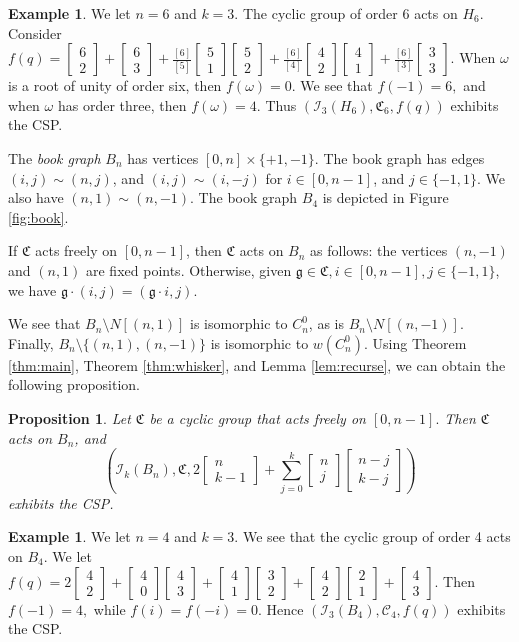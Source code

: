\documentclass[12pt]{article}
\newtheorem{proposition}[theorem]{Proposition}
\theoremstyle{definition}
\newtheorem{example}[theorem]{Example}
\newcommand{\gau}[2]{\left[ \begin{array}{c} #1 \\ #2 \end{array} \right]}
\begin{document}
\begin{example}
We let $n = 6$ and $k=3.$ The cyclic group of order $6$ acts on $H_6.$
Consider $f(q) = \gau{6}{2}+\gau{6}{3} + \frac{[6]}{[5]}\gau{5}{1}\gau{5}{2} + \frac{[6]}{[4]}\gau{4}{2}\gau{4}{1}+\frac{[6]}{[3]}\gau{3}{3}.$ When $\omega$ is a root of unity of order six, then $f(\omega) = 0$. We see that $f(-1) = 6,$ and when $\omega$ has order three, then $f(\omega) = 4$. Thus $(\mathcal{I}_3(H_6), \mathfrak{C}_6, f(q))$ exhibits the CSP.
\end{example}

The \emph{book graph} $B_n$ has vertices $[0,n] \times \{+1,-1\}.$ The book graph has edges $(i,j) \sim (n,j)$, and $(i,j) \sim (i,-j)$ for $i \in [0,n-1]$, and $j \in \{-1,1\}.$ We also have $(n,1) \sim (n,-1).$ The book graph $B_4$ is depicted in Figure \ref{fig:book}.

If $\mathfrak{C}$ acts freely on $[0,n-1]$, then $\mathfrak{C}$ acts on $B_n$ as follows: the vertices $(n,-1)$ and $(n,1)$ are fixed points. Otherwise, given $\mathfrak{g} \in \mathfrak{C}, i \in [0,n-1], j \in \{-1, 1\}$, we have $\mathfrak{g} \cdot (i,j) = (\mathfrak{g}\cdot i, j)$.

We see that $B_n \setminus N[(n,1)]$ is isomorphic to $C_n^0$, as is $B_n \setminus N[(n,-1)]$. Finally, $B_n \setminus \{(n,1), (n,-1)\}$ is isomorphic to $w(C^0_n).$ Using Theorem \ref{thm:main}, Theorem \ref{thm:whisker}, and Lemma \ref{lem:recurse}, we can obtain the following proposition.
\begin{proposition}
Let $\mathfrak{C}$ be a cyclic group that acts freely on $[0,n-1].$ Then $\mathfrak{C}$ acts on $B_n$, and \[\left(\mathcal{I}_k(B_n), \mathfrak{C}, 2\gau{n}{k-1}+\sum_{j=0}^k \gau{n}{j}\gau{n-j}{k-j} \right)\] exhibits the CSP.
\end{proposition}

\begin{example}
We let $n=4$ and $k=3.$
We see that the cyclic group of order 4 acts on $B_4$. We let $f(q) = 2\gau{4}{2}+\gau{4}{0}\gau{4}{3}+\gau{4}{1}\gau{3}{2}+\gau{4}{2}\gau{2}{1}+\gau{4}{3}$. Then $f(-1) = 4,$ while $f(i) = f(-i) = 0.$ Hence $(\mathcal{I}_3(B_4), \mathcal{C}_4, f(q))$ exhibits the CSP.
\end{example}
\end{document}
